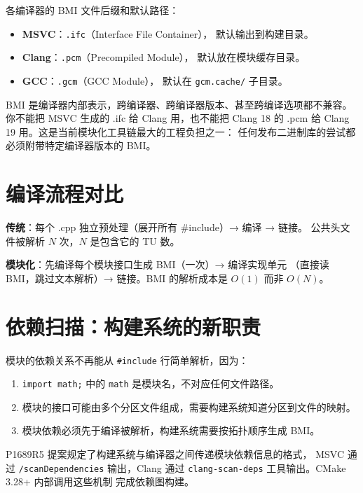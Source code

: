 \documentclass[12pt,a4paper,fontset=fandol]{ctexbook}
\newcommand{\flag}[1]{\texttt{#1}}
\begin{document}
各编译器的 BMI 文件后缀和默认路径：

\begin{itemize}
  \item \textbf{MSVC}：\texttt{.ifc}（Interface File Container），
        默认输出到构建目录。
  \item \textbf{Clang}：\texttt{.pcm}（Precompiled Module），
        默认放在模块缓存目录。
  \item \textbf{GCC}：\texttt{.gcm}（GCC Module），
        默认在 \texttt{gcm.cache/} 子目录。
\end{itemize}

\begin{warning}[title=BMI 不可移植]
BMI 是编译器内部表示，跨编译器、跨编译器版本、甚至跨编译选项都不兼容。
你不能把 MSVC 生成的 .ifc 给 Clang 用，也不能把 Clang 18 的 .pcm 给
Clang 19 用。这是当前模块化工具链最大的工程负担之一：
任何发布二进制库的尝试都必须附带特定编译器版本的 BMI。
\end{warning}

\section{编译流程对比}

\begin{compare}[title=传统 vs 模块化构建]
\textbf{传统}：每个 .cpp 独立预处理（展开所有 \#include）→ 编译 → 链接。
公共头文件被解析 $N$ 次，$N$ 是包含它的 TU 数。

\textbf{模块化}：先编译每个模块接口生成 BMI（一次）→ 编译实现单元
（直接读 BMI，跳过文本解析）→ 链接。BMI 的解析成本是 $O(1)$
而非 $O(N)$。
\end{compare}

\section{依赖扫描：构建系统的新职责}

模块的依赖关系不再能从 \flag{\#include} 行简单解析，因为：

\begin{enumerate}
  \item \flag{import math;} 中的 \texttt{math} 是模块名，不对应任何文件路径。
  \item 模块的接口可能由多个分区文件组成，需要构建系统知道分区到文件的映射。
  \item 模块依赖必须先于编译被解析，构建系统需要按拓扑顺序生成 BMI。
\end{enumerate}

P1689R5 提案规定了构建系统与编译器之间传递模块依赖信息的格式，
MSVC 通过 \flag{/scanDependencies} 输出，Clang 通过
\flag{clang-scan-deps} 工具输出。CMake 3.28+ 内部调用这些机制
完成依赖图构建。
\end{document}
